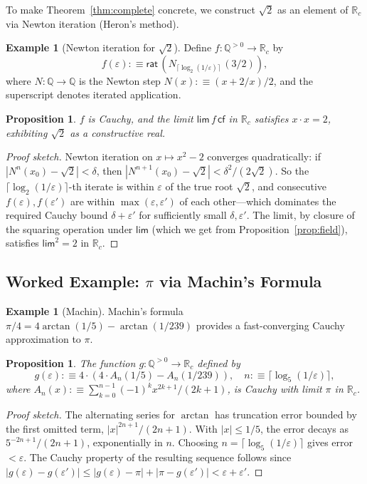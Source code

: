 \documentclass[12pt]{article}
\newtheorem{proposition}[theorem]{Proposition}
\theoremstyle{definition}
\newtheorem{example}[theorem]{Example}
\theoremstyle{remark}
\newcommand{\Q}{\mathbb{Q}}
\newcommand{\Rc}{\mathbb{R}_{c}}
\newcommand{\rat}{\mathsf{rat}}
\newcommand{\hlim}{\mathsf{lim}}
\begin{document}
To make Theorem~\ref{thm:complete} concrete, we construct $\sqrt{2}$
as an element of $\Rc$ via Newton iteration (Heron's method).

\begin{example}[Newton iteration for $\sqrt{2}$]
\label{ex:sqrt2}
Define $f : \Q^{>0} \to \Rc$ by
\[
f(\varepsilon) :\equiv \rat\,(N_{\lceil \log_2(1/\varepsilon)\rceil}\,(3/2)),
\]
where $N : \Q \to \Q$ is the Newton step
$N(x) :\equiv (x + 2/x)/2$, and the superscript denotes iterated
application.
\end{example}

\begin{proposition}
$f$ is Cauchy, and the limit
$\hlim\,f\,\mathsf{cf}$ in $\Rc$ satisfies $x \cdot x = 2$, exhibiting
$\sqrt{2}$ as a constructive real.
\end{proposition}
\begin{proof}[Proof sketch]
Newton iteration on $x \mapsto x^2 - 2$ converges quadratically: if
$|N^n(x_0) - \sqrt{2}| < \delta$, then
$|N^{n+1}(x_0) - \sqrt{2}| < \delta^2 / (2\sqrt{2})$. So the
$\lceil \log_2(1/\varepsilon)\rceil$-th iterate is within
$\varepsilon$ of the true root $\sqrt{2}$, and consecutive
$f(\varepsilon), f(\varepsilon')$ are within
$\max(\varepsilon, \varepsilon')$ of each other---which dominates the
required Cauchy bound $\delta + \varepsilon'$ for sufficiently small
$\delta, \varepsilon'$. The limit, by closure of the squaring operation
under $\hlim$ (which we get from
Proposition~\ref{prop:field}), satisfies $\hlim^2 = 2$ in $\Rc$.
\end{proof}

\subsection{Worked Example: $\pi$ via Machin's Formula}

\begin{example}[Machin]
\label{ex:machin}
Machin's formula $\pi/4 = 4\arctan(1/5) - \arctan(1/239)$ provides a
fast-converging Cauchy approximation to $\pi$.
\end{example}

\begin{proposition}
The function $g : \Q^{>0} \to \Rc$ defined by
\[
g(\varepsilon) :\equiv 4 \cdot (4 \cdot A_n(1/5) - A_n(1/239)),
\quad n :\equiv \lceil \log_5(1/\varepsilon) \rceil,
\]
where $A_n(x) :\equiv \sum_{k=0}^{n-1} (-1)^k x^{2k+1}/(2k+1)$, is
Cauchy with limit $\pi$ in $\Rc$.
\end{proposition}
\begin{proof}[Proof sketch]
The alternating series for $\arctan$ has truncation error bounded by
the first omitted term, $|x|^{2n+1}/(2n+1)$. With
$|x| \leq 1/5$, the error decays as $5^{-2n+1}/(2n+1)$, exponentially
in $n$. Choosing $n = \lceil \log_5(1/\varepsilon) \rceil$ gives error
$< \varepsilon$. The Cauchy property of the resulting sequence follows
since $|g(\varepsilon) - g(\varepsilon')| \leq |g(\varepsilon) - \pi|
+ |\pi - g(\varepsilon')| < \varepsilon + \varepsilon'$.
\end{proof}
\end{document}
